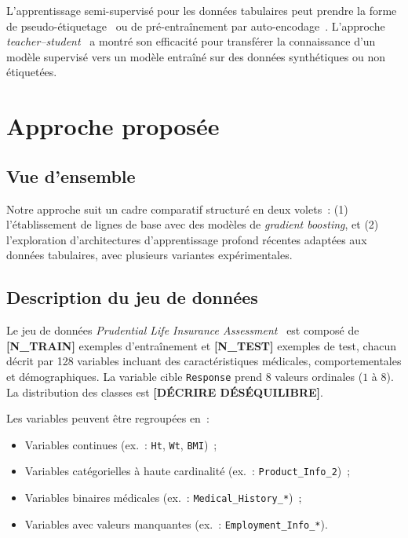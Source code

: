 \documentclass[conference]{IEEEtran}
\begin{document}
L'apprentissage semi-supervisé pour les données tabulaires peut prendre la forme de
pseudo-étiquetage~\cite{lee2013pseudo} ou de pré-entraînement par auto-encodage~\cite{TODO}.
L'approche \textit{teacher--student}~\cite{hinton2015distilling} a montré son efficacité pour
transférer la connaissance d'un modèle supervisé vers un modèle entraîné sur des données
synthétiques ou non étiquetées.

\section{Approche proposée}
\label{sec:approche}

\subsection{Vue d'ensemble}

Notre approche suit un cadre comparatif structuré en deux volets~: (1) l'établissement de
lignes de base avec des modèles de \textit{gradient boosting}, et (2) l'exploration
d'architectures d'apprentissage profond récentes adaptées aux données tabulaires, avec
plusieurs variantes expérimentales.

\subsection{Description du jeu de données}

Le jeu de données \textit{Prudential Life Insurance Assessment}~\cite{kaggle_prudential}
est composé de \textbf{[N\_TRAIN]} exemples d'entraînement et \textbf{[N\_TEST]} exemples
de test, chacun décrit par 128 variables incluant des caractéristiques médicales, comportementales
et démographiques. La variable cible \texttt{Response} prend 8 valeurs ordinales ($1$ à $8$).
La distribution des classes est \textbf{[DÉCRIRE DÉSÉQUILIBRE]}.

Les variables peuvent être regroupées en~:
\begin{itemize}
  \item Variables continues (ex.~: \texttt{Ht}, \texttt{Wt}, \texttt{BMI})~;
  \item Variables catégorielles à haute cardinalité (ex.~: \texttt{Product\_Info\_2})~;
  \item Variables binaires médicales (ex.~: \texttt{Medical\_History\_*})~;
  \item Variables avec valeurs manquantes (ex.~: \texttt{Employment\_Info\_*}).
\end{itemize}
\end{document}
